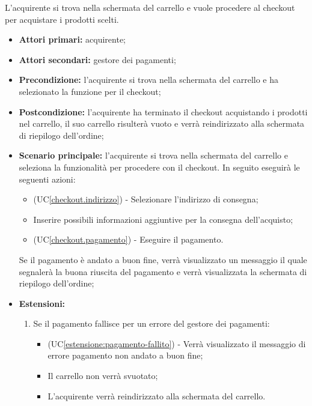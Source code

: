 
\label{checkout}


L'acquirente si trova nella schermata del carrello e vuole procedere al checkout per acquistare i prodotti scelti.
\begin{itemize}
    \item \textbf{Attori primari:} acquirente;
    \item \textbf{Attori secondari:} gestore dei pagamenti;
    \item \textbf{Precondizione:} l'acquirente si trova nella schermata del carrello e ha selezionato la funzione per il checkout;
    \item \textbf{Postcondizione:} l'acquirente ha terminato il checkout acquistando i prodotti nel carrello, il suo carrello risulterà vuoto e verrà reindirizzato alla schermata di riepilogo dell'ordine;
    \item \textbf{Scenario principale:} l'acquirente si trova nella schermata del carrello e seleziona la funzionalità per procedere con il checkout. In seguito eseguirà le seguenti azioni:
    \begin{itemize}
    	\item (UC\ref{checkout.indirizzo}) - Selezionare l'indirizzo di consegna;
    	\item Inserire possibili informazioni aggiuntive per la consegna dell'acquisto;
        \item (UC\ref{checkout.pagamento}) - Eseguire il pagamento.
    \end{itemize}
    Se il pagamento è andato a buon fine, verrà visualizzato un messaggio il quale segnalerà la buona riuscita del pagamento e verrà visualizzata la schermata di riepilogo dell'ordine;
    \item \textbf{Estensioni:}
    \begin{enumerate}[label=\lett]
        \item Se il pagamento fallisce per un errore del gestore dei pagamenti:
        \begin{itemize}
            \item (UC\ref{estensione:pagamento-fallito}) - Verrà visualizzato il messaggio di errore pagamento non andato a buon fine;
            \item Il carrello non verrà svuotato;
            \item L'acquirente verrà reindirizzato alla schermata del carrello.
        \end{itemize}
    \end{enumerate}
\end{itemize}

